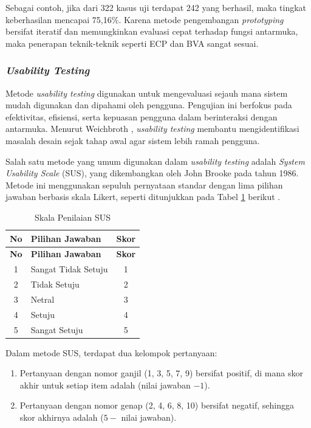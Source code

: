 Sebagai contoh, jika dari 322 kasus uji terdapat 242 yang berhasil, maka tingkat keberhasilan mencapai 75,16\%. Karena metode pengembangan \textit{prototyping} bersifat iteratif dan memungkinkan evaluasi cepat terhadap fungsi antarmuka, maka penerapan teknik-teknik seperti ECP dan BVA sangat sesuai.\par

\subsubsection{\textit{Usability Testing}} \label{II.UsabilityTesting}
Metode \textit{usability testing} digunakan untuk mengevaluasi sejauh mana sistem mudah digunakan dan dipahami oleh pengguna. Pengujian ini berfokus pada efektivitas, efisiensi, serta kepuasan pengguna dalam berinteraksi dengan antarmuka. Menurut Weichbroth \cite{weichbroth2024usability}, \textit{usability testing} membantu mengidentifikasi masalah desain sejak tahap awal agar sistem lebih ramah pengguna.\par

Salah satu metode yang umum digunakan dalam \textit{usability testing} adalah \textit{System Usability Scale} (SUS), yang dikembangkan oleh John Brooke pada tahun 1986. Metode ini menggunakan sepuluh pernyataan standar dengan lima pilihan jawaban berbasis skala Likert, seperti ditunjukkan pada Tabel \ref{table:2.skalaSUS} berikut \cite{istika2024system}.\par

\begin{longtable}{|c|p{}|c|}
	\caption{Skala Penilaian SUS}
	\label{table:2.skalaSUS}\\
	\hline
	\textbf{No} & \textbf{Pilihan Jawaban} & \textbf{Skor} \\
	\hline
	\endfirsthead
	\hline
	\textbf{No} & \textbf{Pilihan Jawaban} & \textbf{Skor} \\
	\hline
	\endhead
	1 & Sangat Tidak Setuju & 1 \\
	\hline
	2 & Tidak Setuju & 2 \\
	\hline
	3 & Netral & 3 \\
	\hline
	4 & Setuju & 4 \\
	\hline
	5 & Sangat Setuju & 5 \\
	\hline
\end{longtable}

Dalam metode SUS, terdapat dua kelompok pertanyaan:\par
\begin{enumerate}[noitemsep]
	\item Pertanyaan dengan nomor ganjil (1, 3, 5, 7, 9) bersifat positif, di mana skor akhir untuk setiap item adalah (nilai jawaban $- 1$).
	\item Pertanyaan dengan nomor genap (2, 4, 6, 8, 10) bersifat negatif, sehingga skor akhirnya adalah ($5 -$ nilai jawaban).
\end{enumerate}

